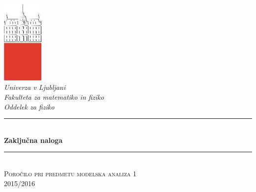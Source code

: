 \documentclass[slovene,11pt,a4paper]{article}
\numberwithin{equation}{section} %
\numberwithin{figure}{section} %
\numberwithin{table}{section} %
\begin{document}
\begin{titlepage}

\newcommand{\HRule}{\rule{\linewidth}{0.5mm}} %

\center %


 

\includegraphics[width=2cm]{slike/aaa}\\[0.5cm]
 
\textit{Univerza v Ljubljani}\\
\textit{Fakulteta za {\color{red}matematiko in fiziko}}\\[0.5cm]

\emph{Oddelek za fiziko}\\[0.5cm] %


\HRule \\[0.4cm]
\huge {\bfseries Zaključna naloga}\\[0.4cm] %
\HRule \\[0.5cm] 

 \textsc{\large Poročilo pri predmetu modelska analiza 1}\\
 \textsc{\large 2015/2016}\\[1cm] %
 

\end{titlepage}
\end{document}
